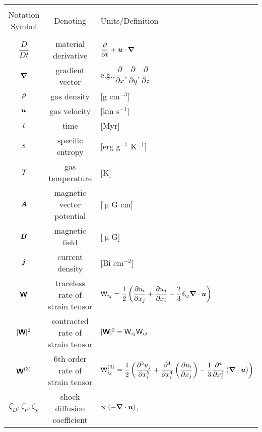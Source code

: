 \documentclass[preprint2]{aastex63}
\newcommand{\vect}[1]{{{\mbox{\boldmath $#1$}}}}%
\newcommand{\mathbfss}[1]{\textbf{\textsf{#1}}}
\begin{document}
\begin{table*}[h]
\begin{tabular}{ccl}
\hline\hline\\
{Notation Symbol} & {Denoting} & {Units/Definition}\\\hline\\
 $\dfrac{D}{Dt}$ & material derivative & $\dfrac{\partial }{\partial t}+\vect{u}\cdot \vect\nabla$ \\
 $\vect\nabla$ & gradient vector & e.g.,$\dfrac{\partial }{\partial x},\dfrac{\partial }{\partial y},\dfrac{\partial }{\partial z}$ \\
 $\rho$ & gas density & [g cm$^{-3}$]  \\
 $\vect u$ & gas velocity & [km s$^{-1}$] \\
 $t$ & time & [Myr] \\
 $s$ & specific entropy & [erg g$^{-1}$ K$^{-1}$] \\
 $T$ & gas temperature & [K] \\
 $\vect A$ & magnetic vector potential & [$\upmu$G cm] \\
 $\vect B$ & magnetic field & [$\upmu$G] \\
 $\vect j$ & current density & [Bi cm$^{-2}$] \\
 $\mathbfss W$ & traceless rate of strain tensor &
   ${\mathsf W}_{ij} = \dfrac{1}{2}\left(\dfrac{\partial u_i}{\partial x_j}
                  + \dfrac{\partial u_j}{\partial x_i}
                  -\dfrac{2}{3} \delta_{ij}\vect\nabla\cdot \vect u\right)$ \\
 $|\mathbfss W|^2$ & contracted rate of strain tensor &
   $|\mathbfss W|^2={\mathsf W}_{ij}{\mathsf W}_{ij}$\\
 $\mathbfss W^{(3)}$ & 6th order rate of strain tensor &
   ${\mathsf W}_{ij}^{(3)} = \dfrac{1}{2}\left(\dfrac{\partial^5 u_j}{\partial x_i^5}
                  + \dfrac{\partial^4}{\partial x_i^4}\left(\dfrac{\partial u_i}{\partial x_j}\right)
                  -\dfrac{1}{3}\dfrac{\partial^4}{\partial x_i^4}\left(\vect\nabla\cdot \vect u\right)\right)$ \\
 $\zeta_{D},\zeta_{\nu},\zeta_{\chi}$ & shock diffusion coefficient& $\propto \left(-\vect\nabla\cdot\vect u\right)_+$\\

\end{tabular}
\end{table*}
\end{document}
